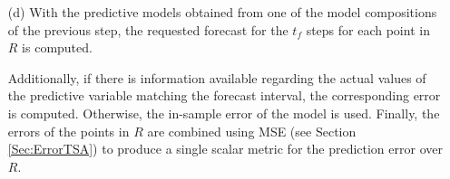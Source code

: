 \begin{itemize}
\begin{itemize}
\begin{algorithm}[h!]
\begin{algorithmic}[1]

\EndFunction 
\end{algorithmic} 
\end{algorithm}
\end{itemize}
 
 \item [(d)] With the predictive models obtained from one of the model compositions of the previous step, the requested forecast for the $t_{f}$ steps for each point in $R$ is computed. 
 
 Additionally, if there is information available regarding the actual values of the predictive variable matching the forecast interval, the corresponding error is computed. Otherwise, the in-sample error of the model is used. Finally, the errors of the points in $R$ are combined using MSE (see Section \ref{Sec:ErrorTSA}) to produce a single scalar metric for the prediction error over $R$.
\end{itemize}

